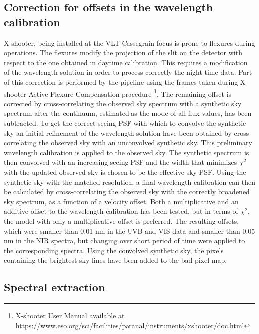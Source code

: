 \documentclass{aa}    %
\begin{document}
\subsection{Correction for offsets in the wavelength calibration}    \label{wavecal}

X-shooter, being installed at the VLT Cassegrain focus is  prone to flexures
during operations. The flexures modify the projection of the slit on the
detector with respect to the one obtained in daytime calibration. This requires
a modification of the wavelength solution in order to process correctly the
night-time data. Part of this correction is performed by the pipeline using the
frames taken during X-shooter Active Flexure Compensation procedure
\footnote{X-shooter User Manual available at
	https://www.eso.org/sci/facilities/paranal/instruments/xshooter/doc.html}. The
remaining offset is corrected by cross-correlating the observed sky spectrum
with a synthetic sky spectrum \citep{Noll2012, Jones2013} after the continuum,
estimated as the mode of all flux values, has been subtracted. To get the
correct seeing PSF with which to convolve the synthetic sky an initial
refinement of the wavelength solution have been obtained by cross-correlating
the observed sky with an unconvolved synthetic sky. This preliminary wavelength
calibration is applied to the observed sky. The synthetic spectrum is then
convolved with an increasing seeing PSF and the width that minimizes $\chi^2$
with the updated observed sky is chosen to be the effective sky-PSF. Using the
synthetic sky with the matched resolution, a final wavelength calibration can
then be calculated by cross-correlating the observed sky with the correctly
broadened sky spectrum, as a function of a velocity offset. Both a
multiplicative and an additive offset to the wavelength calibration has been
tested, but in terms of $\chi^2$, the model with only a multiplicative offset is
preferred. The resulting offsets, which were smaller than 0.01 nm in the UVB and
VIS data and smaller than 0.05 nm in the NIR spectra, but changing over short
period of time were applied to the corresponding spectra. Using the convolved
synthetic sky, the pixels containing the brightest sky lines have been added to
the bad pixel map.

\subsection{Spectral extraction}    \label{extract}
\end{document}
